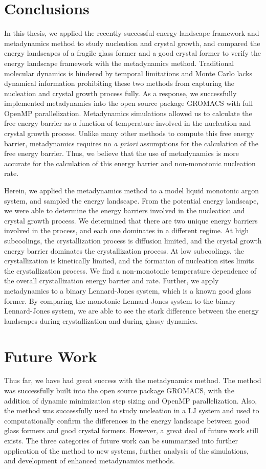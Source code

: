 \section{Conclusions}
In this thesis, we applied the recently successful energy landscape framework and metadynamics method to study nucleation and crystal growth, and compared the energy landscapes of a fragile glass former and a good crystal former to verify the energy landscape framework with the metadynamics method.  Traditional molecular dynamics is hindered by temporal limitations and Monte Carlo lacks dynamical information prohibiting these two methods from capturing the nucleation and crystal growth process fully.  As a response, we successfully implemented metadynamics into the open source package GROMACS with full OpenMP parallelization.  Metadynamics simulations allowed us to calculate the free energy barrier as a function of temperature involved in the nucleation and crystal growth process.  Unlike many other methods to compute this free energy barrier, metadynamics requires no \textit{a priori} assumptions for the calculation of the free energy barrier.  Thus, we believe that the use of metadynamics is more accurate for the calculation of this energy barrier and non-monotonic nucleation rate. 

Herein, we applied the metadynamics method to a model liquid monotonic argon system, and sampled the energy landscape.  From the potential energy landscape, we were able to determine the energy barriers involved in the nucleation and crystal growth process.  We determined that there are two unique energy barriers involved in the process, and each one dominates in a different regime.  At high subcoolings, the crystallization process is diffusion limited, and the crystal growth energy barrier dominates the crystallization process.  At low subcoolings, the crystallization is kinetically limited, and the formation of nucleation sites limits the crystallization process.  We find a non-monotonic temperature dependence of the overall crystallization energy barrier and rate.  Further, we apply metadynamics to a binary Lennard-Jones system, which is a known good glass former.  By comparing the monotonic Lennard-Jones system to the binary Lennard-Jones system, we are able to see the stark difference between the energy landscapes during crystallization and during glassy dynamics.

\section{Future Work}
Thus far, we have had great success with the metadynamics method.  The method was successfully built into the open source package GROMACS, with the addition of dynamic minimization step sizing and OpenMP parallelization.  Also, the method was successfully used to study nucleation in a LJ system and used to computationally confirm the differences in the energy landscape between good glass formers and good crystal formers.  However, a great deal of future work still exists.  The three categories of future work can be summarized into further application of the method to new systems, further analysis of the simulations, and development of enhanced metadynamics methods.

